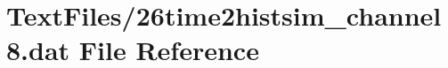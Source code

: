 \hypertarget{26time2histsim__channel8_8dat}{}\section{Text\+Files/26time2histsim\+\_\+channel8.dat File Reference}
\label{26time2histsim__channel8_8dat}
